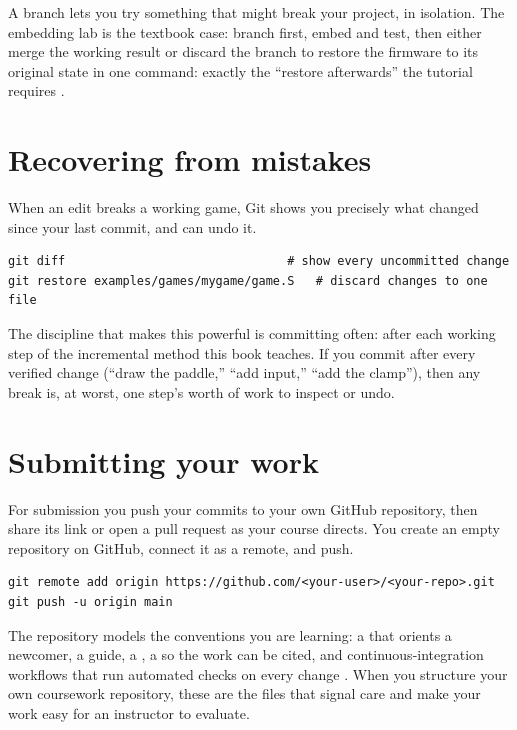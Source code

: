 \begin{prgconcept}
A branch lets you try something that might break your project, in isolation. The
embedding lab is the textbook case: branch first, embed and test, then either merge
the working result or discard the branch to restore the firmware to its original
state in one command: exactly the ``restore afterwards'' the tutorial requires
\citep{prg32tutorialc}.
\end{prgconcept}

\section{Recovering from mistakes}

When an edit breaks a working game, Git shows you precisely what changed since your
last commit, and can undo it.

\begin{lstlisting}[style=bash,caption={Seeing and undoing uncommitted changes.}]
git diff                               # show every uncommitted change
git restore examples/games/mygame/game.S   # discard changes to one file
\end{lstlisting}

The discipline that makes this powerful is committing often: after each working
step of the incremental method this book teaches. If you commit after every
verified change (``draw the paddle,'' ``add input,'' ``add the clamp''), then any
break is, at worst, one step's worth of work to inspect or undo.

\section{Submitting your work}

For submission you push your commits to your own GitHub repository, then share its
link or open a pull request as your course directs. You create an empty repository
on GitHub, connect it as a remote, and push.

\begin{lstlisting}[style=bash,caption={Publishing your work to your own GitHub repository.}]
git remote add origin https://github.com/<your-user>/<your-repo>.git
git push -u origin main
\end{lstlisting}

\begin{prgaside}
The \prg repository models the conventions you are learning: a  that
orients a newcomer, a  guide, a , a
 so the work can be cited, and continuous-integration workflows
that run automated checks on every change \citep{prg32repo}. When you structure your
own coursework repository, these are the files that signal care and make your work
easy for an instructor to evaluate.
\end{prgaside}

